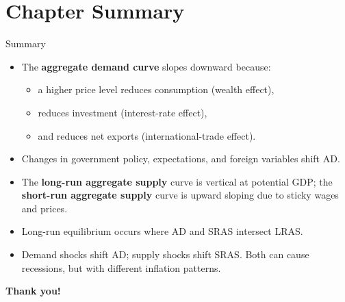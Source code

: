 \documentclass[aspectratio=169]{beamer}
\begin{document}
\section*{Chapter Summary}

\begin{frame}{Summary}
\transfade
\begin{itemize}[<+->]
  \item The \textbf{aggregate demand curve} slopes downward because:
  \begin{itemize}[<+->]
    \item a higher price level reduces consumption (wealth effect),
    \item reduces investment (interest-rate effect),
    \item and reduces net exports (international-trade effect).
  \end{itemize}
  \item Changes in government policy, expectations, and foreign variables shift AD.
  \item The \textbf{long-run aggregate supply} curve is vertical at potential GDP; the \textbf{short-run aggregate supply} curve is upward sloping due to sticky wages and prices.
  \item Long-run equilibrium occurs where AD and SRAS intersect LRAS.
  \item Demand shocks shift AD; supply shocks shift SRAS. Both can cause recessions, but with different inflation patterns.
\end{itemize}
\end{frame}

\begin{frame}
\centering
\Huge \textbf{Thank you!}
\end{frame}
\end{document}
